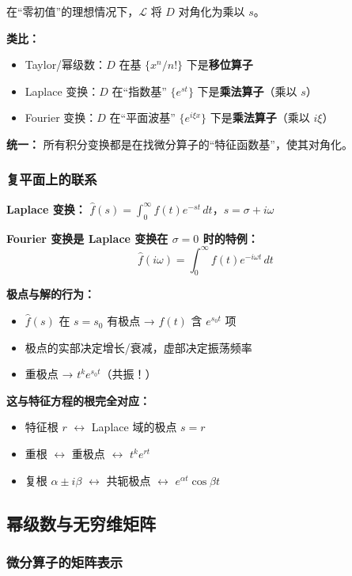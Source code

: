 在“零初值”的理想情况下，$\mathcal{L}$ 将 $D$ 对角化为乘以 $s$。

\textbf{类比：}
\begin{itemize}
  \item Taylor/幂级数：$D$ 在基 $\{x^n/n!\}$ 下是\textbf{移位算子}
  \item Laplace 变换：$D$ 在“指数基” $\{e^{st}\}$ 下是\textbf{乘法算子}（乘以 $s$）
  \item Fourier 变换：$D$ 在“平面波基” $\{e^{i\xi x}\}$ 下是\textbf{乘法算子}（乘以 $i\xi$）
\end{itemize}

\textbf{统一：} 所有积分变换都是在找微分算子的“特征函数基”，使其对角化。

\subsubsection{复平面上的联系}

\textbf{Laplace 变换：} $\hat{f}(s) = \int_0^\infty f(t)e^{-st}\,dt$，$s = \sigma + i\omega$

\textbf{Fourier 变换是 Laplace 变换在 $\sigma = 0$ 时的特例：}
\[
\hat{f}(i\omega) = \int_0^\infty f(t)e^{-i\omega t}\,dt
\]

\textbf{极点与解的行为：}
\begin{itemize}
  \item $\hat{f}(s)$ 在 $s = s_0$ 有极点 → $f(t)$ 含 $e^{s_0 t}$ 项
  \item 极点的实部决定增长/衰减，虚部决定振荡频率
  \item 重极点 → $t^k e^{s_0 t}$（共振！）
\end{itemize}

\textbf{这与特征方程的根完全对应：}
\begin{itemize}
  \item 特征根 $r$ $\leftrightarrow$ Laplace 域的极点 $s = r$
  \item 重根 $\leftrightarrow$ 重极点 $\leftrightarrow$ $t^k e^{rt}$
  \item 复根 $\alpha \pm i\beta$ $\leftrightarrow$ 共轭极点 $\leftrightarrow$ $e^{\alpha t}\cos\beta t$
\end{itemize}

\subsection{幂级数与无穷维矩阵}
\label{subsec:infdim-matrix}

\subsubsection{微分算子的矩阵表示}

